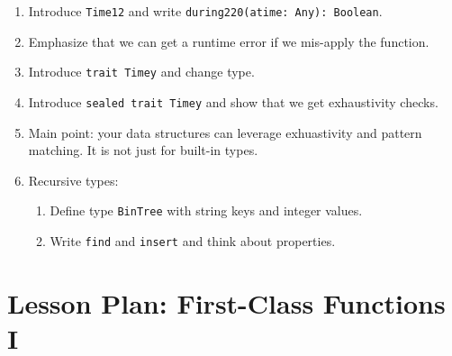 \documentclass[9pt]{extbook}
\begin{document}
\begin{enumerate}
  \item Introduce \lstinline|Time12| and write \lstinline|during220(atime: Any): Boolean|.

  \item Emphasize that we can get a runtime error if we mis-apply the function.

  \item Introduce \lstinline|trait Timey| and change type.

  \item Introduce \lstinline|sealed trait Timey| and show that we get exhaustivity checks.

  \item Main point: your data structures can leverage
  exhuastivity and pattern matching. It is not just for built-in
  types.

  \item Recursive types:

  \begin{enumerate}

  \item Define type \lstinline|BinTree| with string keys and integer values.

  \item Write \lstinline|find| and \lstinline|insert| and think about properties.

  \end{enumerate}

\end{enumerate}

\chapter{Lesson Plan: First-Class Functions I}
\end{document}
